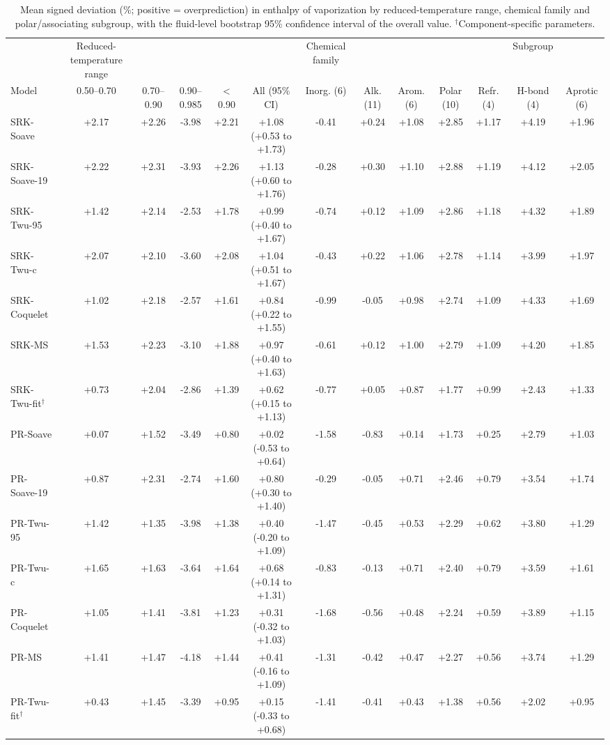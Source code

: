 \begin{table}[H]
\centering
\caption{Mean signed deviation (\%; positive = overprediction) in enthalpy of vaporization by reduced-temperature range, chemical family and polar/associating subgroup, with the fluid-level bootstrap 95\% confidence interval of the overall value. $^{\dagger}$Component-specific parameters.}
\label{tab:tabS_signed_h}
\small
\begin{tabular}{lcccccccccccc}
\toprule
 & Reduced-temperature range &  &  &  &  & Chemical family &  &  &  &  & Subgroup &  \\
Model & 0.50--0.70 & 0.70--0.90 & 0.90--0.985 & < 0.90 & All (95\% CI) & Inorg. (6) & Alk. (11) & Arom. (6) & Polar (10) & Refr. (4) & H-bond (4) & Aprotic (6) \\
\midrule
SRK-Soave & +2.17 & +2.26 & -3.98 & +2.21 & +1.08 (+0.53 to +1.73) & -0.41 & +0.24 & +1.08 & +2.85 & +1.17 & +4.19 & +1.96 \\
SRK-Soave-19 & +2.22 & +2.31 & -3.93 & +2.26 & +1.13 (+0.60 to +1.76) & -0.28 & +0.30 & +1.10 & +2.88 & +1.19 & +4.12 & +2.05 \\
SRK-Twu-95 & +1.42 & +2.14 & -2.53 & +1.78 & +0.99 (+0.40 to +1.67) & -0.74 & +0.12 & +1.09 & +2.86 & +1.18 & +4.32 & +1.89 \\
SRK-Twu-c & +2.07 & +2.10 & -3.60 & +2.08 & +1.04 (+0.51 to +1.67) & -0.43 & +0.22 & +1.06 & +2.78 & +1.14 & +3.99 & +1.97 \\
SRK-Coquelet & +1.02 & +2.18 & -2.57 & +1.61 & +0.84 (+0.22 to +1.55) & -0.99 & -0.05 & +0.98 & +2.74 & +1.09 & +4.33 & +1.69 \\
SRK-MS & +1.53 & +2.23 & -3.10 & +1.88 & +0.97 (+0.40 to +1.63) & -0.61 & +0.12 & +1.00 & +2.79 & +1.09 & +4.20 & +1.85 \\
SRK-Twu-fit$^{\dagger}$ & +0.73 & +2.04 & -2.86 & +1.39 & +0.62 (+0.15 to +1.13) & -0.77 & +0.05 & +0.87 & +1.77 & +0.99 & +2.43 & +1.33 \\
\midrule
PR-Soave & +0.07 & +1.52 & -3.49 & +0.80 & +0.02 (-0.53 to +0.64) & -1.58 & -0.83 & +0.14 & +1.73 & +0.25 & +2.79 & +1.03 \\
PR-Soave-19 & +0.87 & +2.31 & -2.74 & +1.60 & +0.80 (+0.30 to +1.40) & -0.29 & -0.05 & +0.71 & +2.46 & +0.79 & +3.54 & +1.74 \\
PR-Twu-95 & +1.42 & +1.35 & -3.98 & +1.38 & +0.40 (-0.20 to +1.09) & -1.47 & -0.45 & +0.53 & +2.29 & +0.62 & +3.80 & +1.29 \\
PR-Twu-c & +1.65 & +1.63 & -3.64 & +1.64 & +0.68 (+0.14 to +1.31) & -0.83 & -0.13 & +0.71 & +2.40 & +0.79 & +3.59 & +1.61 \\
PR-Coquelet & +1.05 & +1.41 & -3.81 & +1.23 & +0.31 (-0.32 to +1.03) & -1.68 & -0.56 & +0.48 & +2.24 & +0.59 & +3.89 & +1.15 \\
PR-MS & +1.41 & +1.47 & -4.18 & +1.44 & +0.41 (-0.16 to +1.09) & -1.31 & -0.42 & +0.47 & +2.27 & +0.56 & +3.74 & +1.29 \\
PR-Twu-fit$^{\dagger}$ & +0.43 & +1.45 & -3.39 & +0.95 & +0.15 (-0.33 to +0.68) & -1.41 & -0.41 & +0.43 & +1.38 & +0.56 & +2.02 & +0.95 \\
\bottomrule
\end{tabular}
\end{table}
